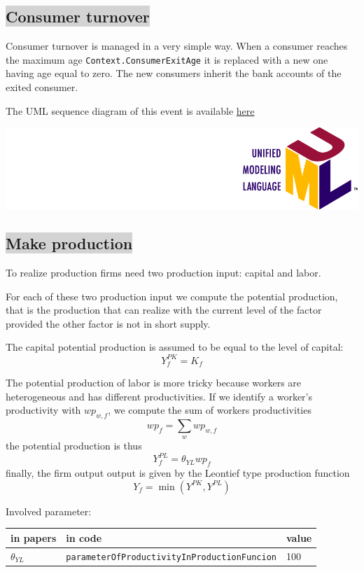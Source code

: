\documentclass{book}
\newcommand{\doclocation}{file:///Users/giulioni/Documents/workspace/gabriele/docs}
\begin{document}
\subsection*{\colorbox{lightgray}{Consumer turnover}}

Consumer turnover is managed in a very simple way. When a consumer reaches the maximum age \verb+Context.ConsumerExitAge+ it is replaced with a new one having age equal to zero. The new consumers inherit the bank accounts of the exited consumer.

\vskip3mm
The UML sequence diagram of this event is available \href{\doclocation/umldoc/performConsumersTurnover.html}{here}
\begin{marginfigure}
	\includegraphics[scale=0.1]{uml.png}
\end{marginfigure}
\vskip3mm




\subsection*{\colorbox{lightgray}{Make production}}
To realize production firms need two production input: capital and labor.

For each of these two production input we compute the potential production, that is the production that can realize with the current level of the factor provided the other factor is not in short supply.

The capital potential production is assumed to be equal to the level of capital:
\[
	Y^{PK}_f=K_f
\]

The potential production of labor is more tricky because workers are heterogeneous and has different productivities.
If we identify a worker's productivity with $wp_{w,f}$, we compute the sum of workers productivities
\[
	wp_f=\sum_{w}wp_{w,f}
\]
the potential production is thus
\[
	Y^{PL}_f=\theta_{YL}wp_f
\]
finally, the firm output output is given by the Leontief type production function
\[
Y_f=\min(Y^{PK},Y^{PL})
\]

Involved parameter:

\begin{tabular}{l l l}
	\hline
	in papers& in code&value\\
	\hline
	\hline
$\theta_{YL}$&\verb+parameterOfProductivityInProductionFuncion+&100\\
	\hline
\end{tabular}
\end{document}
